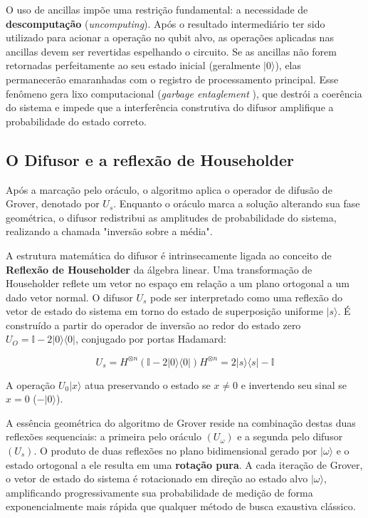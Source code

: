 \documentclass[12pt, a4paper]{article}
\newcommand{\ket}[1]{\lvert #1 \rangle}
\newcommand{\bra}[1]{\langle #1 \rvert}
\begin{document}
O uso de ancillas impõe uma restrição fundamental: a necessidade de \textbf{descomputação} (\textit{uncomputing}). Após o resultado intermediário ter sido utilizado para acionar a operação no qubit alvo, as operações aplicadas nas ancillas devem ser revertidas espelhando o circuito. Se as ancillas não forem retornadas perfeitamente ao seu estado inicial (geralmente $\ket{0}$), elas permanecerão emaranhadas com o registro de processamento principal. Esse fenômeno gera lixo computacional (\textit{garbage entaglement} \cite{nielsen2010}), que destrói a coerência do sistema e impede que a interferência construtiva do difusor amplifique a probabilidade do estado correto.

\subsection{O Difusor e a reflexão de Householder}

Após a marcação pelo oráculo, o algoritmo aplica o operador de difusão de Grover, denotado por $U_s$. Enquanto o oráculo marca a solução alterando sua fase geométrica, o difusor redistribui as amplitudes de probabilidade do sistema, realizando a chamada "inversão sobre a média".

A estrutura matemática do difusor é intrinsecamente ligada ao conceito de \textbf{Reflexão de Householder} da álgebra linear. Uma transformação de Householder reflete um vetor no espaço em relação a um plano ortogonal a um dado vetor normal. O difusor $U_s$ pode ser interpretado como uma reflexão do vetor de estado do sistema em torno do estado de superposição uniforme $\ket{s}$. É construído a partir do operador de inversão ao redor do estado zero $U_O = \mathbb{I} -  2\ket{0}\bra{0}$, conjugado por portas Hadamard:

\begin{equation}
    U_s = H^{\otimes n} (\mathbb{I} - 2\ket{0}\bra{0}) H^{\otimes n} = 2\ket{s}\bra{s} - \mathbb{I}
\end{equation}

A operação $U_0 \ket{x}$ atua preservando o estado se $x \neq 0$ e invertendo seu sinal se $x = 0$ ($-\ket{0}$). 

A essência geométrica do algoritmo de Grover reside na combinação destas duas reflexões sequenciais: a primeira pelo oráculo $(U_\omega)$ e a segunda pelo difusor $(U_s)$. O produto de duas reflexões no plano bidimensional gerado por $\ket{\omega}$ e o estado ortogonal a ele resulta em uma \textbf{rotação pura}. A cada iteração de Grover, o vetor de estado do sistema é rotacionado em direção ao estado alvo $\ket{\omega}$, amplificando progressivamente sua probabilidade de medição de forma exponencialmente mais rápida que qualquer método de busca exaustiva clássico.
\end{document}
